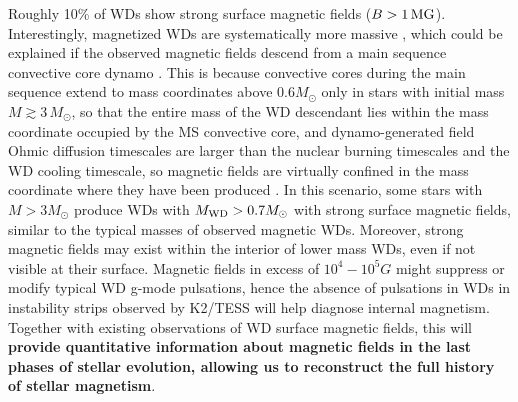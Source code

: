
Roughly 10\% of WDs show strong surface magnetic fields ($B > 1 \, {\rm MG}$).
Interestingly, magnetized WDs are systematically more massive \cite{Ferrario_2015}, which could be explained if the observed magnetic fields descend from a main sequence convective core dynamo \cite{Cantiello_2016}. This is because convective cores during the main sequence extend to mass coordinates above 0.6$M_\odot$ only in stars with initial mass $M \gtrsim 3 \, M_\odot$, so that the entire mass of the WD descendant lies within the mass coordinate occupied by the MS convective core, and dynamo-generated field {\color{green} Ohmic diffusion timescales are larger than the nuclear burning timescales and the WD cooling timescale, so magnetic fields are virtually confined in the mass coordinate where they have been produced \cite{Cantiello_2016}.} In this scenario, some stars with $M>3M_\odot$ produce WDs with $M_{\rm WD}>0.7M_\odot$ with strong surface magnetic fields, similar to the typical masses of observed magnetic WDs. Moreover, strong magnetic fields may exist within the interior of lower mass WDs, even if not visible at their surface. Magnetic fields in excess of $10^4-10^5 G$ might suppress or modify typical WD g-mode pulsations, hence the absence of pulsations in WDs in instability strips observed by K2/TESS will help diagnose internal magnetism. Together with existing observations of WD surface magnetic fields, this will \textbf{provide quantitative information about magnetic fields in the last phases of stellar evolution, allowing us to reconstruct the full history of stellar magnetism}.